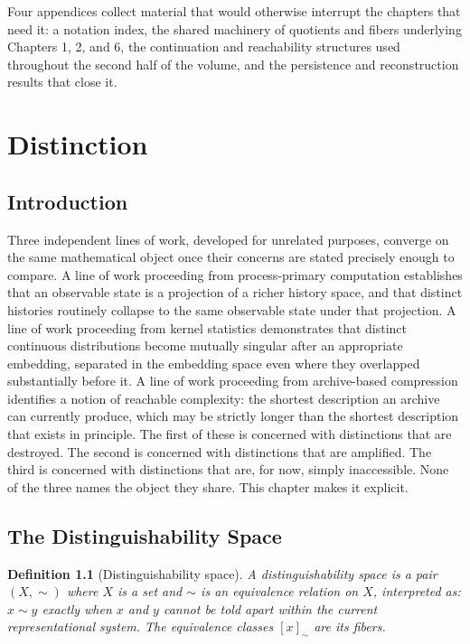 \documentclass[12pt]{report}
\newtheorem{definition}{Definition}[section]
\begin{document}
Four appendices collect material that would otherwise interrupt the
chapters that need it: a notation index, the shared machinery of
quotients and fibers underlying Chapters 1, 2, and 6, the continuation
and reachability structures used throughout the second half of the
volume, and the persistence and reconstruction results that close it.

\tableofcontents

\chapter{Distinction}

\section{Introduction}

Three independent lines of work, developed for unrelated purposes,
converge on the same mathematical object once their concerns are stated
precisely enough to compare. A line of work proceeding from
process-primary computation establishes that an observable state is a
projection of a richer history space, and that distinct histories
routinely collapse to the same observable state under that projection. A
line of work proceeding from kernel statistics demonstrates that distinct
continuous distributions become mutually singular after an appropriate
embedding, separated in the embedding space even where they overlapped
substantially before it. A line of work proceeding from archive-based
compression identifies a notion of reachable complexity: the shortest
description an archive can currently produce, which may be strictly
longer than the shortest description that exists in principle. The first
of these is concerned with distinctions that are destroyed. The second is
concerned with distinctions that are amplified. The third is concerned
with distinctions that are, for now, simply inaccessible. None of the
three names the object they share. This chapter makes it explicit.

\section{The Distinguishability Space}
\label{sec:space}

\begin{definition}[Distinguishability space]
\label{def:dist-space}
A \emph{distinguishability space} is a pair $(X,\sim)$ where $X$ is a set
and $\sim$ is an equivalence relation on $X$, interpreted as: $x \sim y$
exactly when $x$ and $y$ cannot be told apart within the current
representational system. The equivalence classes $[x]_\sim$ are its
\emph{fibers}.
\end{definition}
\end{document}
